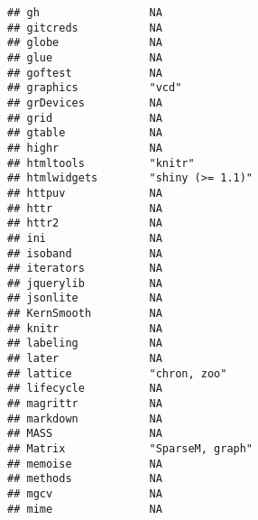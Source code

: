 \documentclass[
]{article}
\begin{document}
\begin{verbatim}
## gh                 NA                                                     
## gitcreds           NA                                                     
## globe              NA                                                     
## glue               NA                                                     
## goftest            NA                                                     
## graphics           "vcd"                                                  
## grDevices          NA                                                     
## grid               NA                                                     
## gtable             NA                                                     
## highr              NA                                                     
## htmltools          "knitr"                                                
## htmlwidgets        "shiny (>= 1.1)"                                       
## httpuv             NA                                                     
## httr               NA                                                     
## httr2              NA                                                     
## ini                NA                                                     
## isoband            NA                                                     
## iterators          NA                                                     
## jquerylib          NA                                                     
## jsonlite           NA                                                     
## KernSmooth         NA                                                     
## knitr              NA                                                     
## labeling           NA                                                     
## later              NA                                                     
## lattice            "chron, zoo"                                           
## lifecycle          NA                                                     
## magrittr           NA                                                     
## markdown           NA                                                     
## MASS               NA                                                     
## Matrix             "SparseM, graph"                                       
## memoise            NA                                                     
## methods            NA                                                     
## mgcv               NA                                                     
## mime               NA                                                     

\end{verbatim}
\end{document}
